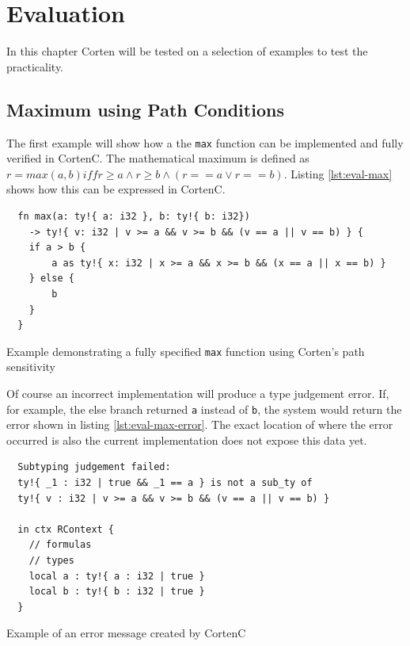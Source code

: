 \documentclass{book}
\newcommand{\code}[1]{\texttt{#1}}
\theoremstyle{definition}
\begin{document}

\chapter{Evaluation}

In this chapter Corten will be tested on a selection of examples to test the practicality.

\section{Maximum using Path Conditions}

The first example will show how a the \code{max} function can be implemented and fully verified in CortenC. The mathematical maximum is defined as $r = max(a, b) iff r \geq a \wedge r \geq b \wedge (r == a \vee r == b)$. Listing \ref{lst:eval-max} shows how this can be expressed in CortenC.


\begin{listing}[h]
  \begin{verbatim}
  fn max(a: ty!{ a: i32 }, b: ty!{ b: i32}) 
    -> ty!{ v: i32 | v >= a && v >= b && (v == a || v == b) } {
    if a > b {
        a as ty!{ x: i32 | x >= a && x >= b && (x == a || x == b) }
    } else {
        b
    }
  }
  \end{verbatim}
  \caption{Example demonstrating a fully specified \code{max} function using Corten's path sensitivity}
  \label{lst:eval-max}
\end{listing}

Of course an incorrect implementation will produce a type judgement error. If, for example, the else branch returned \code{a} instead of \code{b}, the system would return the error shown in listing \ref{lst:eval-max-error}. The exact location of where the error occurred is also the current implementation does not expose this data yet.

\begin{listing}[h]
  \begin{verbatim}
  Subtyping judgement failed: 
  ty!{ _1 : i32 | true && _1 == a } is not a sub_ty of 
  ty!{ v : i32 | v >= a && v >= b && (v == a || v == b) } 

  in ctx RContext {
    // formulas
    // types
    local a : ty!{ a : i32 | true }
    local b : ty!{ b : i32 | true }
  }
  \end{verbatim}
  \caption{Example of an error message created by CortenC}
  \label{lst:eval-max-error}
\end{listing}
\end{document}
